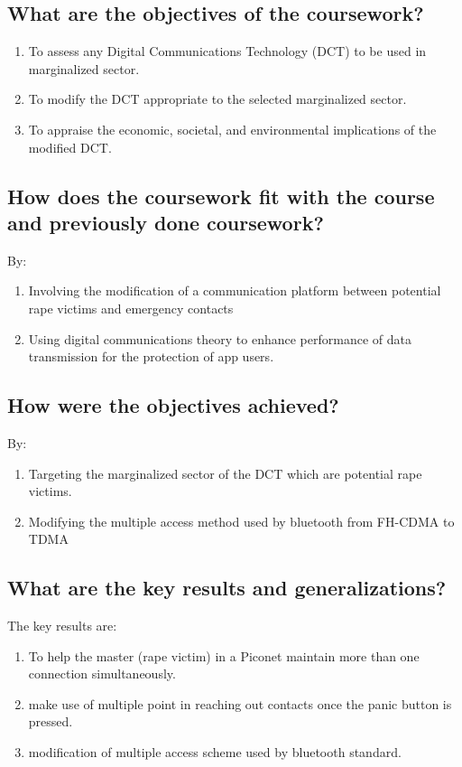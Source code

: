 \IEEEpubidadjcol %

\subsection{What are the objectives of the coursework?}
\begin{enumerate}
	\item To assess any Digital Communications Technology (DCT) to be used in marginalized sector.
	\item To modify the DCT appropriate to the selected marginalized sector.
	\item To appraise the economic, societal, and environmental implications of the modified DCT.
\end{enumerate}	

\subsection{How does the coursework fit with the course and previously done coursework?}
By:
\begin{enumerate}
	\item Involving the modification of a communication platform between potential rape victims and emergency contacts
	
	\item Using digital communications theory to enhance performance of data transmission for the protection of app users.
	
\end{enumerate}	

\subsection{How were the objectives achieved?}
By:
\begin{enumerate}
	\item Targeting the marginalized sector of the DCT which are potential rape victims.
	\item Modifying the multiple access method used by bluetooth from FH-CDMA to TDMA
	
\end{enumerate}

\subsection{What are the key results and generalizations?}
The key results are:
\begin{enumerate}
	\item To help the master (rape victim) in a Piconet maintain more than one connection simultaneously.
	\item make use of multiple point in reaching out contacts once the panic button is pressed.
	\item modification of multiple access scheme used by bluetooth standard.

\end{enumerate}

